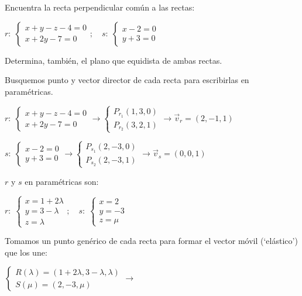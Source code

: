 \begin{ejre}
	Encuentra la recta perpendicular común a las rectas: 
	
	$r:\;\begin{cases}x+y-z-4=0\\x+2y-7=0\end{cases}; \quad s:\;\begin{cases} x-2=0\\y+3=0 \end{cases}$
	
	Determina, también, el plano que equidista de ambas rectas.
\end{ejre}
\begin{proofw}\renewcommand{\qedsymbol}{$\diamond$}	
\noindent Busquemos punto y vector director de cada recta para escribirlas en paramétricas.

\noindent $r:\;\begin{cases}x+y-z-4=0\\x+2y-7=0\end{cases} \to \begin{cases} P_{r_1}(1,3,0) \\ P_{r_2}(3,2,1) \end{cases} \to \vec v_r=(2,-1,1)$

\noindent $s:\;\begin{cases}x-2=0\\y+3=0\end{cases} \to \begin{cases} P_{s_1}(2,-3,0) \\ P_{s_2}(2,-3,1) \end{cases} \to \vec v_s=(0,0,1)$

\noindent $r$ y $s$ en paramétricas son:

\noindent $r:\; \begin{cases} x=1+2\lambda \\ y=3-\lambda \\ z=\lambda \end{cases}; \quad s:\; \begin{cases} x=2\\y=-3\\z=\mu \end{cases}$

\noindent Tomamos un punto genérico de cada recta para formar el vector móvil (`elástico') que los une:

\noindent $\begin{cases} R(\lambda)=(1+2\lambda,3-\lambda,\lambda) \\ S(\mu)=(2,-3,\mu) \end{cases} \to$


\end{proofw}
